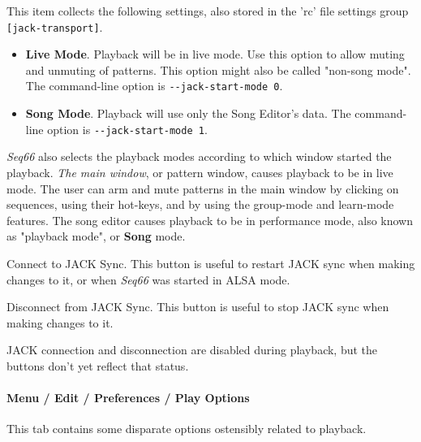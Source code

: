    This item collects the following settings, also stored in the 'rc' file
   settings group \texttt{[jack-transport]}.

   \begin{itemize}
      \item \textbf{Live Mode}.
         Playback will be in live mode.  Use this option to allow muting and
         unmuting of patterns.  This option might also be called "non-song
         mode".
         The command-line option is \texttt{-{}-jack-start-mode 0}.
      \item \textbf{Song Mode}.
         Playback will use only the Song Editor's data.
         The command-line option is \texttt{-{}-jack-start-mode 1}.
   \end{itemize}

   \textsl{Seq66} also selects the playback modes
   according to which window started the playback.
   \textsl{The main window}, or pattern
   window, causes playback to be in live mode.  The user can arm and mute
   patterns in the main window by clicking on sequences, using their hot-keys,
   and by using the group-mode and learn-mode features.
   The song editor causes playback to be in performance mode, also known as
   "playback mode", or \textbf{Song} mode.

   Connect to JACK Sync.
   This button is useful to restart JACK sync when making changes to it,
   or when \textsl{Seq66} was started in ALSA mode.

   Disconnect from JACK Sync.
   This button is useful to stop JACK sync when making changes to it.

   JACK connection and disconnection are disabled during playback, but the
   buttons don't yet reflect that status.

\paragraph{Menu / Edit / Preferences / Play Options}
\label{paragraph:menu_edit_preferences_play_options}

   This tab contains some disparate options ostensibly related to playback.

